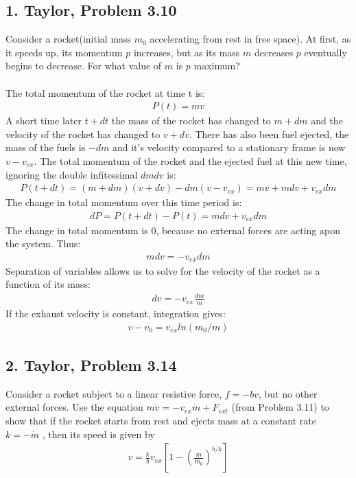 \documentclass[a4paper,12pt]{article}
\begin{document}
\subsection*{1. Taylor, Problem 3.10}
Consider a rocket(initial mass $m_0$ accelerating from rest in free space).  At first, as it speeds up, its momentum $p$ increases, but as its mass $m$ decreases $p$ eventually begins to decrease.  For what value of $m$ is $p$ maximum?\\
\\
The total momentum of the rocket at time t is:
\begin{align*}
P(t)=mv
\end{align*}
A short time later $t+dt$ the mass of the rocket has changed to $m+dm$ and the velocity of the rocket has changed to $v+dv$.  There has also been fuel ejected, the mass of the fuels is $-dm$ and it's velocity compared to a stationary frame is now $v-v_{ex}$. The total momentum of the rocket and the ejected fuel at this new time, ignoring the double infitessimal $dmdv$ is:
\begin{align*}
P(t+dt)=(m+dm)(v+dv)-dm(v-v_{ex})=mv + mdv +v_{ex}dm
\end{align*}
The change in total momentum over this time period is:
\begin{align*}
dP=P(t+dt)-P(t)=mdv+v_{ex}dm
\end{align*}
The change in total momentum is 0, because no external forces are acting apon the system. Thus:
\begin{align*}
mdv=-v_{ex}dm
\end{align*}
Separation of variables allows us to solve for the velocity of the rocket as a function of its mass:
\begin{align*}
dv=-v_{ex}\frac{dm}{m}
\end{align*}
If the exhaust velocity is constant, integration gives:
\begin{align*}
v-v_0=v_{ex}ln(m_0/m)
\end{align*}









\subsection*{2. Taylor, Problem 3.14}
Consider a rocket subject to a linear resistive force,
$f = −bv$, but no other external forces. Use the equation $m\dot{v} = −v_{ex}\dot{m} +
F_{ext}$ (from Problem 3.11) to show that if the rocket starts from rest and
ejects mass at a constant rate $ k = −\dot{m}$ , then its speed is given by
\begin{align*}
v = \frac{k}{b}v_{ex}\left[1-\left(\frac{m}{m_0}\right)^{b/k}\right]
\end{align*}
\end{document}
